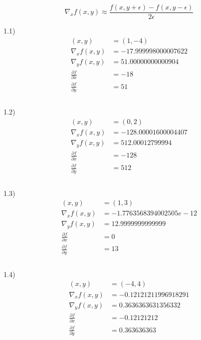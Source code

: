 \documentclass[12pt]{article}         %
\begin{document}
\begin{equation}
	\nabla_x f(x,y) \approx \dfrac{f(x, y + \epsilon) - f(x, y - \epsilon)}{2\epsilon}
\end{equation}

1.1)\\
$$
\begin{aligned}
(x,y) &= (1, -4)\\
\nabla_x f(x,y) &= -17.999998000007622\\
\nabla_y f(x,y) &= 51.00000000000904\\
\frac {\partial f}{\partial x} &= -18\\
\frac {\partial f}{\partial y} &= 51\\\\
\end{aligned}
$$

1.2)\\
$$
\begin{aligned}
(x,y) &= (0, 2)\\
\nabla_x f(x,y) &= -128.00001600004407\\
\nabla_y f(x,y) &= 512.00012799994\\
\frac {\partial f}{\partial x} &= -128\\
\frac {\partial f}{\partial y} &= 512\\\\
\end{aligned}
$$

1.3) \\
$$
\begin{aligned}
(x,y) &= (1, 3)\\
\nabla_x f(x,y) &= -1.7763568394002505e-12\\
\nabla_y f(x,y) &= 12.9999999999999\\
\frac {\partial f}{\partial x} &= 0\\
\frac {\partial f}{\partial y} &= 13\\\\
\end{aligned}
$$

1.4)\\
$$
\begin{aligned}
(x,y) &= (-4, 4)\\
\nabla_x f(x,y) &= -0.12121211996918291\\
\nabla_y f(x,y) &= 0.3636363631356332\\
\frac {\partial f}{\partial x} &= -0.12121212\\
\frac {\partial f}{\partial y} &= 0.363636363\\\\
\end{aligned}
$$
\end{document}
